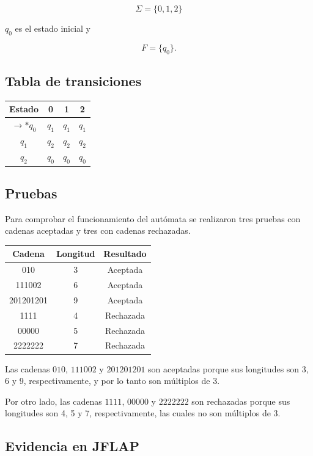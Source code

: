 \documentclass[12pt]{article}
\begin{document}
\[
\Sigma=\{0,1,2\}
\]

$q_0$ es el estado inicial y

\[
F=\{q_0\}.
\]


\subsection*{Tabla de transiciones}

\begin{center}
\begin{tabular}{c|ccc}
\hline
Estado & 0 & 1 & 2 \\
\hline
$\rightarrow *q_0$ & $q_1$ & $q_1$ & $q_1$ \\
$q_1$ & $q_2$ & $q_2$ & $q_2$ \\
$q_2$ & $q_0$ & $q_0$ & $q_0$ \\
\hline
\end{tabular}
\end{center}


\subsection*{Pruebas}

Para comprobar el funcionamiento del autómata se realizaron tres pruebas
con cadenas aceptadas y tres con cadenas rechazadas.

\begin{center}
\begin{tabular}{c|c|c}
\hline
Cadena & Longitud & Resultado \\
\hline
010       & 3 & Aceptada \\
111002    & 6 & Aceptada \\
201201201 & 9 & Aceptada \\
1111      & 4 & Rechazada \\
00000     & 5 & Rechazada \\
2222222   & 7 & Rechazada \\
\hline
\end{tabular}
\end{center}

Las cadenas $010$, $111002$ y $201201201$ son aceptadas porque sus
longitudes son 3, 6 y 9, respectivamente, y por lo tanto son múltiplos
de 3.

Por otro lado, las cadenas $1111$, $00000$ y $2222222$ son rechazadas
porque sus longitudes son 4, 5 y 7, respectivamente, las cuales no son
múltiplos de 3.

\subsection*{Evidencia en JFLAP}
\end{document}
